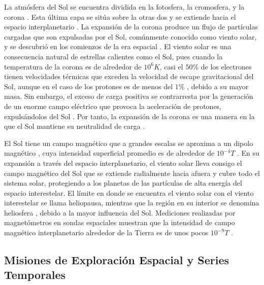 La atmósfera del Sol se encuentra dividida en la fotosfera, la cromosfera, y la corona \cite{Parks, Cravens}. Esta última capa se sitúa sobre la otras dos y se extiende hacia el espacio interplanetario \cite{Kamide}. La expansión de la corona produce un flujo de partículas cargadas que son expulsadas por el Sol, comúnmente conocido como viento solar, y se descubrió en los comienzos de la era espacial \cite{Parks}. El viento solar es una consecuencia natural de estrellas calientes como el Sol, pues cuando la temperatura de la corona es de alrededor de $10^6 K$, casi el $50\%$ de los electrones tienen velocidades térmicas que exceden la velocidad de escape gravitacional del Sol, aunque en el caso de los protones es de menos del $1\%$ \cite{Parks, encrenaz_solar_2004}, debido a su mayor masa. Sin embargo, el exceso de carga positiva se contrarresta por la generación de un enorme campo eléctrico que provoca la aceleración de protones, expulsándolos del Sol \cite{encrenaz_solar_2004}. Por tanto, la expansión de la corona es una manera en la que el Sol mantiene su neutralidad de carga \cite{Parks}. 

El Sol tiene un campo magnético que a grandes escalas se aproxima a un dipolo magnético \cite{Cravens}, cuya intensidad superficial promedio es de alrededor de $10^{-4} T$ \cite{Parks, Kamide, Cravens}. En su expansión a través del espacio interplanetario, el viento solar lleva consigo el campo magnético del Sol que se extiende radialmente hacia afuera \cite{Kamide} y cubre todo el sistema solar, protegiendo a los planetas de las partículas de alta energía del espacio interestelar. El límite en donde se encuentra el viento solar con el viento interestelar se llama heliopausa, mientras que la región en su interior se denomina heliosfera \cite{Parks, encrenaz_solar_2004}, debido a la mayor influencia del Sol. Mediciones realizadas por magnetómetros en sondas espaciales muestran que la intensidad de campo magnético interplanetario alrededor de la Tierra es de unos pocos $10^{-9} T$ \cite{Parks, Kamide}. 

\subsection{Misiones de Exploración Espacial y Series Temporales}

